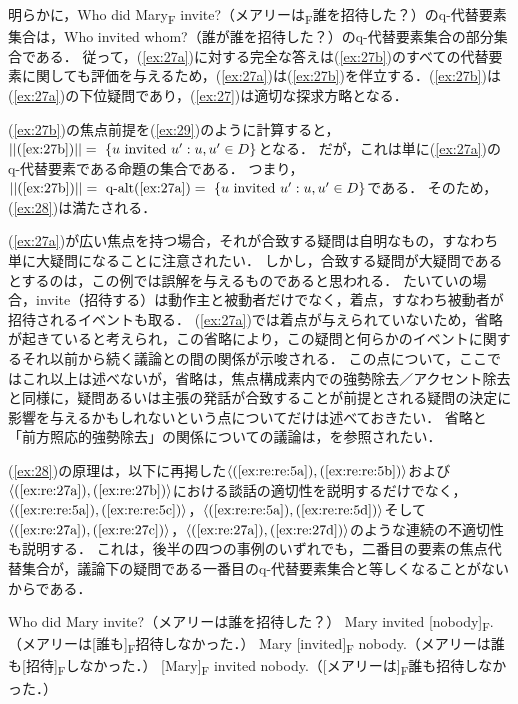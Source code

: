 \documentclass{goken}
\begin{document}
\noindent
明らかに，Who did Mary\textsubscript{F} invite?（メアリーは\textsubscript{F}誰を招待した？）のq-代替要素集合は，Who invited whom?（誰が誰を招待した？）のq-代替要素集合の部分集合である．
従って，(\ref{ex:27a})に対する完全な答えは(\ref{ex:27b})のすべての代替要素に関しても評価を与えるため，(\ref{ex:27a})は(\ref{ex:27b})を伴立する．(\ref{ex:27b})は(\ref{ex:27a})の下位疑問であり，(\ref{ex:27})は適切な探求方略となる．

(\ref{ex:27b})の焦点前提を(\ref{ex:29})のように計算すると，$||(\text{\ref{ex:27b}})|| =\ \{u\text{ invited }u': u, u' \in D\}$となる．
だが，これは単に(\ref{ex:27a})のq-代替要素である命題の集合である．
つまり，$||(\text{\ref{ex:27b}})|| =\ \text{q-alt}(\text{\ref{ex:27a}}) =\ \{u\text{ invited }u': u, u' \in D\}$である．
そのため，(\ref{ex:28})は満たされる．

(\ref{ex:27a})が広い焦点を持つ場合，それが合致する疑問は自明なもの，すなわち単に大疑問になることに注意されたい．
しかし，合致する疑問が大疑問であるとするのは，この例では誤解を与えるものであると思われる．
たいていの場合，invite（招待する）は動作主と被動者だけでなく，着点，すなわち被動者が招待されるイベントも取る．
(\ref{ex:27a})では着点が与えられていないため，省略が起きていると考えられ，この省略により，この疑問と何らかのイベントに関するそれ以前から続く議論との間の関係が示唆される．
この点について，ここではこれ以上は述べないが，省略は，焦点構成素内での強勢除去／アクセント除去と同様に，疑問あるいは主張の発話が合致することが前提とされる疑問の決定に影響を与えるかもしれないという点についてだけは述べておきたい．
省略と「前方照応的強勢除去」の関係についての議論は，\citealt{Rooth1992b}を参照されたい．

(\ref{ex:28})の原理は，以下に再掲した$\langle(\text{\ref{ex:re:re:5a}}), (\text{\ref{ex:re:re:5b}})\rangle$および$\langle(\text{\ref{ex:re:27a}}),
 (\text{\ref{ex:re:27b}})\rangle$における談話の適切性を説明するだけでなく，$\langle(\text{\ref{ex:re:re:5a}}), (\text{\ref{ex:re:re:5c}})\rangle$，$\langle(\text{\ref{ex:re:re:5a}}),
 (\text{\ref{ex:re:re:5d}})\rangle$そして$\langle(\text{\ref{ex:re:27a}}), (\text{\ref{ex:re:27c}})\rangle$，$\langle(\text{\ref{ex:re:27a}}),
 (\text{\ref{ex:re:27d}})\rangle$のような連続の不適切性も説明する．
これは，後半の四つの事例のいずれでも，二番目の要素の焦点代替集合が，議論下の疑問である一番目のq-代替要素集合と等しくなることがないからである．

\setcounter{exx}{4}
\begin{exe}
	\ex\label{ex:re:re:5}
	\begin{xlist}
    \ex\label{ex:re:re:5a} Who did Mary invite?（メアリーは誰を招待した？）
    \ex\label{ex:re:re:5b} Mary invited [nobody]\textsubscript{F}.（メアリーは[誰も]\textsubscript{F}招待しなかった．）
    \ex\label{ex:re:re:5c} Mary [invited]\textsubscript{F} nobody.（メアリーは誰も[招待]\textsubscript{F}しなかった．）
    \ex\label{ex:re:re:5d} [Mary]\textsubscript{F} invited nobody.（[メアリーは]\textsubscript{F}誰も招待しなかった．）
  \end{xlist}
\end{exe}
\end{document}
